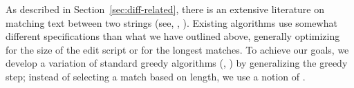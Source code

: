 As described in Section~\ref{sec:diff-related}, there is an extensive
literature on matching text between two strings (see, \eg,
\cite{Hunt1976,Hirschberg1977,Tichy1984,Myers1986,Burns1997}).
Existing algorithms use somewhat different specifications than what
we have outlined above, generally optimizing for the size of the edit
script or for the longest matches.
To achieve our goals, we develop a variation of
standard greedy algorithms (\eg, \cite{Hirschberg1977,Myers1986,Burns1997})
by generalizing the greedy step; instead of selecting a match
based on length, we use a notion of .

\begin{comment}

\begin{algorithm}
\KwData{Two lists of words, $a$ and $b$.}
\KwResult{$\txtauthor{\version{n}, w_j}$,
	for all $w_j \in \words{\version{n}}$.
}
\Begin{
    $idx \leftarrow $ new Hashtable \;
    \For{$i \leftarrow 1$ \KwTo length$(b)$ }{
	$ idx[ b[i] ] \leftarrow i $\;
    }
    $h \leftarrow $ new PriorityHeap \;
    \For{$i \leftarrow 1$ \KwTo $ \left| \words{\version{n}} \right| $ }{
	$ m \leftarrow \match{\version{n}, i, \prevrevs{\version{n}}} $ \;
	\eIf{$m = \emptyset$}{
	    $ \txtauthor{\version{n}, i} = \revauthor{\version{n}} $ \;
	}{
	    $ \txtauthor{\version{n}, i} = \txtauthor{m} $ \;
	}
    }
}
\caption{Algorithm for tracking text authorship.}
\end{algorithm}

\end{comment}

